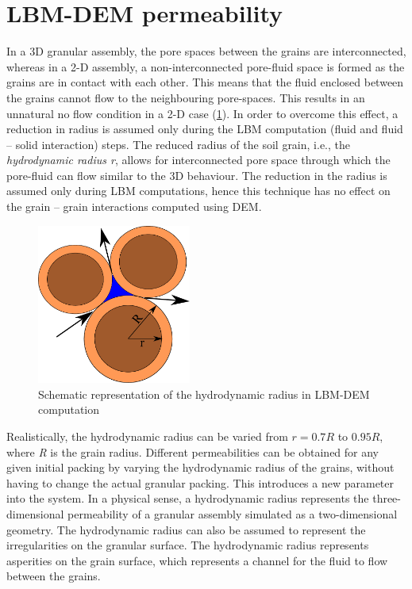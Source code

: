 \section{LBM-DEM permeability}

In a 3D granular assembly, the pore spaces between the grains are 
interconnected, whereas in a 2-D assembly, a non-interconnected pore-fluid 
space is formed as the grains are in contact with each 
other. This means that the fluid enclosed between the grains cannot flow 
to the neighbouring pore-spaces.  This results in an unnatural no flow 
condition in 
a 2-D case (\cref{fig:reduction}). In order to overcome this effect, a 
reduction in radius is assumed only during the LBM computation (fluid and fluid 
– solid interaction) steps. The reduced radius of the soil grain, i.e., the 
\textit{hydrodynamic radius r}, allows for interconnected pore space through 
which the pore-fluid can flow similar to the 3D behaviour. The reduction in 
the radius is assumed only during LBM computations, hence this technique has no 
effect on the grain – grain interactions computed using DEM. 

\begin{figure}[htpb]
\centering
\includegraphics[width=0.45\textwidth]{reduction}
\caption{Schematic representation of the hydrodynamic radius in LBM-DEM 
computation}
\label{fig:reduction}
\end{figure}

Realistically, the hydrodynamic radius can be varied from $ r = 0.7 R$ to 
$0.95R$, where \textit{R} is the grain radius. Different permeabilities can be 
obtained for any given initial packing by varying the hydrodynamic radius of 
the grains, without having to change the actual granular packing. This 
introduces a new parameter into the system. In a physical sense, a 
hydrodynamic radius represents the three-dimensional permeability of a 
granular assembly simulated as a two-dimensional geometry. The hydrodynamic 
radius can also be assumed to represent the irregularities on the granular 
surface. The hydrodynamic radius represents asperities on 
the grain surface, which represents a channel for the fluid to flow between the 
grains. 

